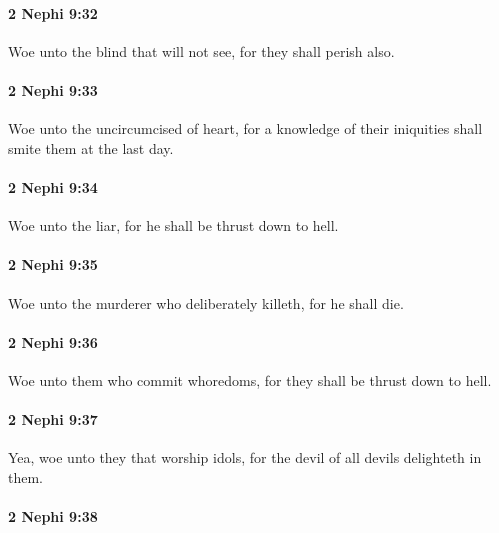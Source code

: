 		\paragraph{2 Nephi 9:32} %
			\label{2NEPHI-9-32}

			Woe unto the blind that will not see,
			for they shall perish also.

		\paragraph{2 Nephi 9:33} %
			\label{2NEPHI-9-33}

			Woe unto the uncircumcised of heart,
			for a knowledge of their iniquities shall smite them at the last day.

		\paragraph{2 Nephi 9:34} %
			\label{2NEPHI-9-34}

			Woe unto the liar,
			for he shall be thrust down to hell.

		\paragraph{2 Nephi 9:35} %
			\label{2NEPHI-9-35}

			Woe unto the murderer who deliberately killeth,
			for he shall die.

		\paragraph{2 Nephi 9:36} %
			\label{2NEPHI-9-36}

			Woe unto them who commit whoredoms,
			for they shall be thrust down to hell.

		\paragraph{2 Nephi 9:37} %
			\label{2NEPHI-9-37}

			Yea, woe unto they that worship idols,
			for the devil of all devils delighteth in them.

		\paragraph{2 Nephi 9:38} %
			\label{2NEPHI-9-38}

